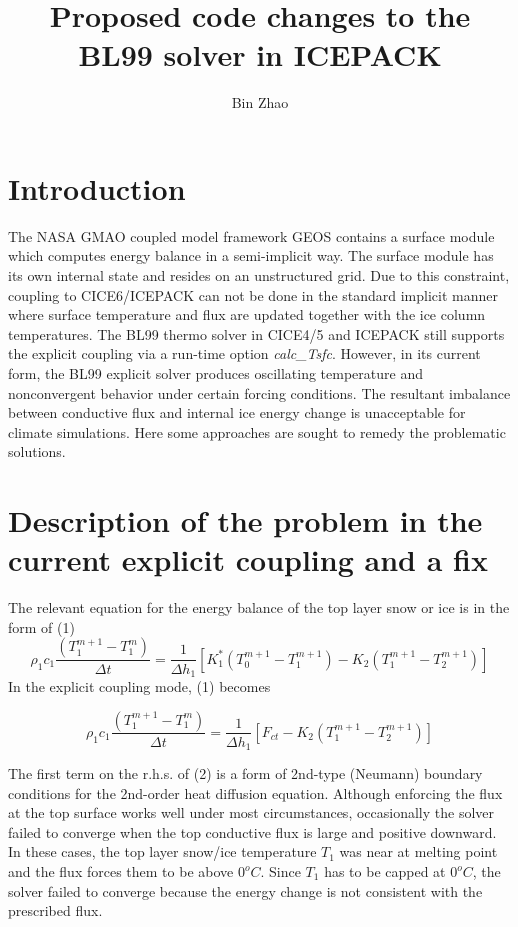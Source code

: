 \documentclass[10pt,letterpaper,oneside]{article}
\title{Proposed code changes to the BL99 solver in ICEPACK}
\author{Bin Zhao}
\begin{document}
\section{Introduction}
The NASA GMAO coupled model framework GEOS contains a surface module which computes energy balance in a semi-implicit way. The surface module has its own internal state and resides on an unstructured grid. Due to this constraint, coupling to CICE6/ICEPACK can not be done in the standard implicit manner where surface temperature and flux are updated together with the ice column temperatures. The BL99 thermo solver in CICE4/5 and ICEPACK still supports the explicit coupling via a run-time option \emph{calc\_Tsfc}.  However, in its current form, the BL99 explicit solver produces oscillating temperature and nonconvergent behavior under certain forcing conditions. The resultant imbalance between conductive flux and internal ice energy change is unacceptable for climate simulations. Here some approaches are sought to remedy the problematic solutions.   


\section{Description of the problem in the current explicit coupling and a fix}

The relevant equation for the energy balance of the top layer snow or ice  is in the form of (1) \newline
\begin{equation} 
\rho_{1}c_{1}\frac{\left( T^{m+1}_{1}-T^{m}_{1} \right)}{\Delta{t}}=\frac{1}{\Delta{h_{1}}} \left[ K^{*}_1  \left( T^{m+1}_{0}-T^{m+1}_{1} \right) - K_{2}  \left( T^{m+1}_{1}-T^{m+1}_{2} \right) \right] 
\end{equation}
\newline In the explicit coupling mode, (1) becomes\newline

  \begin{equation} 
  \rho_{1}c_{1}\frac{\left( T^{m+1}_{1}-T^{m}_{1} \right)}{\Delta{t}}=\frac{1}{\Delta{h_{1}}} \left[ F_{ct} - K_{2}  \left( T^{m+1}_{1}-T^{m+1}_{2} \right) \right]
  \end{equation}
   
The first term on the r.h.s. of (2) is a form of 2nd-type (Neumann) boundary conditions for the 2nd-order heat diffusion equation. Although enforcing the flux at the top surface works well under most circumstances, occasionally the solver failed to converge when the top conductive flux is large and positive downward. In these cases, the top layer snow/ice temperature $T_{1}$ was near at melting point and the flux forces them to be above $0^{o}C$. Since $T_{1}$ has to be capped at $0^{o}C$, the solver failed to converge because the energy change is not consistent with the prescribed flux.     \newline
\end{document}
